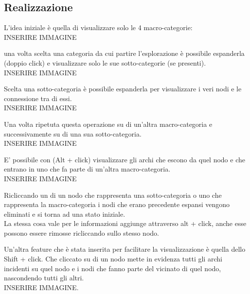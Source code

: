 \documentclass{beamer}
\begin{document}
\subsection{Realizzazione}
\begin{frame}
L'idea iniziale è quella di visualizzare solo le 4 macro-categorie:\\
INSERIRE IMMAGINE
\end{frame}

\begin{frame}
una volta scelta una categoria da cui partire l'esplorazione è possibile espanderla (doppio click) e visualizzare solo le sue sotto-categorie (se presenti).\\
INSERIRE IMMAGINE
\end{frame}

\begin{frame}
Scelta una sotto-categoria è possibile espanderla per visualizzare i veri nodi e le connessione tra di essi.\\
INSERIRE IMMAGINE 
\end{frame}

\begin{frame}
Una volta ripetuta questa operazione su di un'altra macro-categoria e successivamente su di una sua  sotto-categoria.\\
INSERIRE IMMAGINE
\end{frame}

\begin{frame}
E' possibile con (Alt + click) visualizzare gli archi che escono da quel nodo e che entrano in uno che fa parte di un'altra macro-categoria.\\
INSERIRE IMMAGINE
\end{frame}

\begin{frame}
Ricliccando un di un nodo che rappresenta una sotto-categoria o uno che rappresenta la macro-categoria i nodi che erano precedente espansi vengono eliminati e si torna ad una stato iniziale.\\
\medskip
La stessa cosa vale per le informazioni aggiunge attraverso alt + click, anche esse possono essere rimosse ricliccando sullo stesso nodo. 
\end{frame}

\begin{frame}
Un'altra feature che è stata inserita per facilitare la visualizzazione è quella dello Shift + click. Che cliccato su di un nodo mette in evidenza tutti gli archi incidenti su quel nodo e i nodi che fanno parte del vicinato di quel nodo, nascondendo tutti gli altri.\\
INSERIRE IMMAGINE.
\end{frame}
\end{document}
